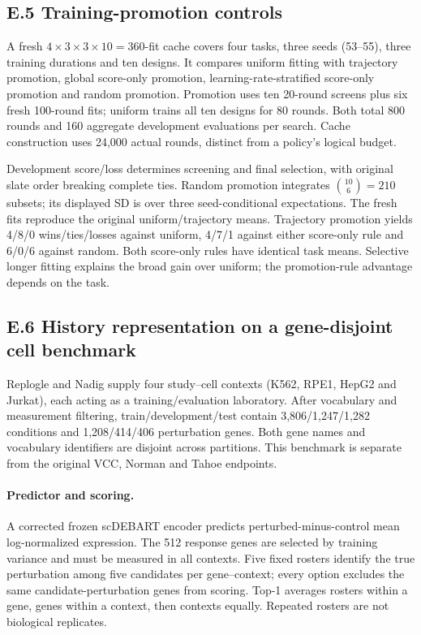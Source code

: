 \subsection*{E.5 Training-promotion controls}
A fresh $4\times3\times3\times10=360$-fit cache covers four tasks, three seeds (53--55), three training durations and ten designs. It compares uniform fitting with trajectory promotion, global score-only promotion, learning-rate-stratified score-only promotion and random promotion. Promotion uses ten 20-round screens plus six fresh 100-round fits; uniform trains all ten designs for 80 rounds. Both total 800 rounds and 160 aggregate development evaluations per search. Cache construction uses 24,000 actual rounds, distinct from a policy's logical budget.



Development score/loss determines screening and final selection, with original slate order breaking complete ties. Random promotion integrates $\binom{10}{6}=210$ subsets; its displayed SD is over three seed-conditional expectations. The fresh fits reproduce the original uniform/trajectory means. Trajectory promotion yields 4/8/0 wins/ties/losses against uniform, 4/7/1 against either score-only rule and 6/0/6 against random. Both score-only rules have identical task means. Selective longer fitting explains the broad gain over uniform; the promotion-rule advantage depends on the task.

\subsection*{E.6 History representation on a gene-disjoint cell benchmark}
Replogle and Nadig supply four study--cell contexts (K562, RPE1, HepG2 and Jurkat), each acting as a training/evaluation laboratory. After vocabulary and measurement filtering, train/development/test contain 3,806/1,247/1,282 conditions and 1,208/414/406 perturbation genes. Both gene names and vocabulary identifiers are disjoint across partitions. This benchmark is separate from the original VCC, Norman and Tahoe endpoints.

\paragraph{Predictor and scoring.}
A corrected frozen scDEBART encoder predicts perturbed-minus-control mean log-normalized expression. The 512 response genes are selected by training variance and must be measured in all contexts. Five fixed rosters identify the true perturbation among five candidates per gene--context; every option excludes the same candidate-perturbation genes from scoring. Top-1 averages rosters within a gene, genes within a context, then contexts equally. Repeated rosters are not biological replicates.

